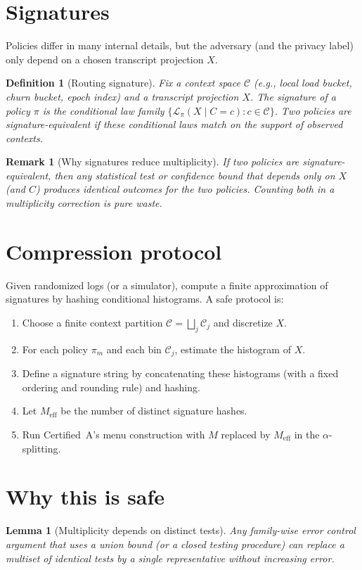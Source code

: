 \documentclass[11pt]{article}
\newtheorem{definition}{Definition}
\newtheorem{lemma}{Lemma}
\newtheorem{remark}{Remark}
\begin{document}
\section{Signatures}
Policies differ in many internal details, but the adversary (and the privacy label) only depend on a chosen transcript projection $X$.

\begin{definition}[Routing signature]
Fix a context space $\mathcal C$ (e.g., local load bucket, churn bucket, epoch index) and a transcript projection $X$.
The \emph{signature} of a policy $\pi$ is the conditional law family $\{\mathcal L_\pi(X\mid C=c): c\in\mathcal C\}$.
Two policies are signature-equivalent if these conditional laws match on the support of observed contexts.
\end{definition}

\begin{remark}[Why signatures reduce multiplicity]
If two policies are signature-equivalent, then any statistical test or confidence bound that depends only on $X$ (and $C$) produces identical outcomes for the two policies.
Counting both in a multiplicity correction is pure waste.
\end{remark}

\section{Compression protocol}
Given randomized logs (or a simulator), compute a finite approximation of signatures by hashing conditional histograms.
A safe protocol is:
\begin{enumerate}[leftmargin=*]
\item Choose a finite context partition $\mathcal C=\bigsqcup_j \mathcal C_j$ and discretize $X$.
\item For each policy $\pi_m$ and each bin $\mathcal C_j$, estimate the histogram of $X$.
\item Define a signature string by concatenating these histograms (with a fixed ordering and rounding rule) and hashing.
\item Let $M_{\mathrm{eff}}$ be the number of distinct signature hashes.
\item Run Certified~A's menu construction with $M$ replaced by $M_{\mathrm{eff}}$ in the $\alpha$-splitting.
\end{enumerate}

\section{Why this is safe}
\begin{lemma}[Multiplicity depends on distinct tests]
Any family-wise error control argument that uses a union bound (or a closed testing procedure) can replace a multiset of identical tests by a single representative without increasing error.
\end{lemma}
\end{document}
